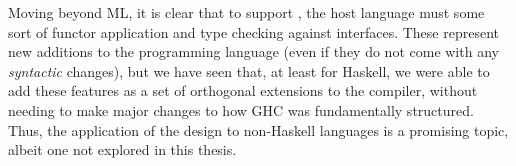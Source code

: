 Moving beyond ML, it is clear that to support \Backpack{}, the host
language must some sort of functor application and type checking
against interfaces.  These represent new additions to the programming
language (even if they do not come with any \emph{syntactic} changes),
but we have seen that, at least for Haskell, we were able to add these
features as a set of orthogonal extensions to the compiler,
without needing to make major changes to how GHC was fundamentally
structured.  Thus, the application of the \Backpack{} design to
non-Haskell languages is a promising topic, albeit one not explored
in this thesis.
